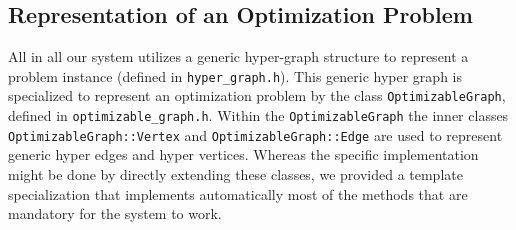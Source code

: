 \documentclass[a4paper]{article}
\begin{document}
\subsection {Representation of an Optimization Problem}
\label{sec:representation}
All in all our system utilizes a generic hyper-graph structure to
represent a problem instance (defined in \verb+hyper_graph.h+).  This
generic hyper graph is specialized to represent an optimization
problem by the class \verb+OptimizableGraph+, defined in
\verb+optimizable_graph.h+.  Within the \verb+OptimizableGraph+ the
inner classes \verb+OptimizableGraph::Vertex+ and
\verb+OptimizableGraph::Edge+ are used to represent generic hyper
edges and hyper vertices.  Whereas the specific implementation might
be done by directly extending these classes, we provided a template
specialization that implements automatically most of the methods that
are mandatory for the system to work.
\end{document}
